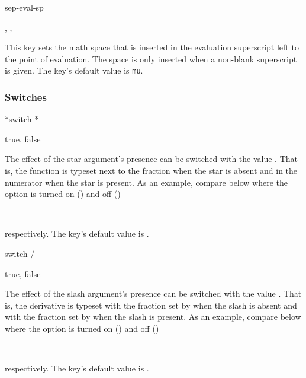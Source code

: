 	\begin{option}{sep-eval-sp}
		\begin{values}[default = 0]
			, , 
		\end{values}
		This key sets the math space that is inserted in the evaluation superscript left to the point of evaluation. The space is only inserted when a non-blank superscript is given. The key's default value is  \texttt{mu}.
	\end{option}
	
	\subsubsection*{Switches}
	
	\begin{option}*{switch-*}
		\begin{values}[default = false]
			true, false
		\end{values}
		The effect of the star argument's presence can be switched with the value . That is, the function is typeset next to the fraction when the star is absent and in the numerator when the star is present. As an example, compare below where the option is turned on () and off ()
		
		\begin{example}
			 \\
		\end{example}
		
		\noindent respectively. The key's default value is \default.
	\end{option}
	
	\begin{option}{switch-/}
		\begin{values}[default = false]
			true, false
		\end{values}
		The effect of the slash argument's presence can be switched with the value . That is, the derivative is typeset with the fraction set by  when the slash is absent and with the fraction set by  when the slash is present. As an example, compare below where the option is turned on () and off (\val{false})
		
		\begin{example}
			\pdv[switch-/=false]{y}{x} \\
			\pdv[switch-/=true]{y}{x}
		\end{example}
		
		\noindent respectively. The key's default value is .
	\end{option}
	
